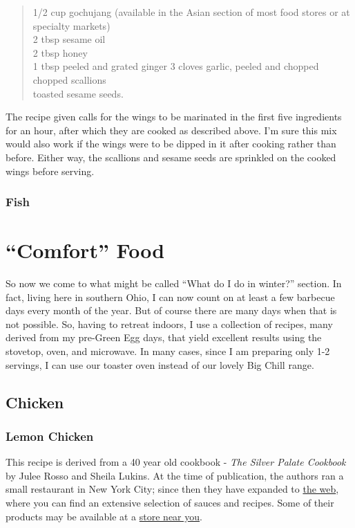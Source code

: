 \documentclass[
]{book}
\begin{document}
\begin{quote}
1/2 cup gochujang (available in the Asian section of most food stores or at specialty markets)\\
2 tbsp sesame oil\\
2 tbsp honey\\
1 tbsp peeled and grated ginger
3 cloves garlic, peeled and chopped
chopped scallions\\
toasted sesame seeds.
\end{quote}

The recipe given calls for the wings to be marinated in the first five ingredients for an hour, after which they are cooked as described above. I'm sure this mix would also work if the wings were to be dipped in it after cooking rather than before. Either way, the scallions and sesame seeds are sprinkled on the cooked wings before serving.

\hypertarget{fish}{%
\subsection{Fish}\label{fish}}

\hypertarget{comfort}{%
\chapter{``Comfort'' Food}\label{comfort}}

So now we come to what might be called ``What do I do in winter?'' section. In fact, living here in southern Ohio, I can now count on at least a few barbecue days every month of the year. But of course there are many days when that is not possible. So, having to retreat indoors, I use a collection of recipes, many derived from my pre-Green Egg days, that yield excellent results using the stovetop, oven, and microwave. In many cases, since I am preparing only 1-2 servings, I can use our toaster oven instead of our lovely Big Chill range.

\hypertarget{chicken-1}{%
\section{Chicken}\label{chicken-1}}

\hypertarget{lemon-chicken}{%
\subsection{Lemon Chicken}\label{lemon-chicken}}

This recipe is derived from a 40 year old cookbook - \emph{The Silver Palate Cookbook} by Julee Rosso and Sheila Lukins. At the time of publication, the authors ran a small restaurant in New York City; since then they have expanded to \href{https://www.silverpalate.com/}{the web}, where you can find an extensive selection of sauces and recipes. Some of their products may be available at a \href{https://www.silverpalate.com/stores}{store near you}.
\end{document}
